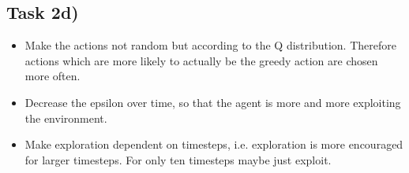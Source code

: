 \documentclass{article}
\begin{document}
\subsection*{Task 2d)}

\begin{itemize}
\item Make the actions not random but according to the Q distribution. Therefore actions which are more likely to actually be the greedy action are chosen more often.
\item Decrease the epsilon over time, so that the agent is more and more exploiting the environment.
\item Make exploration dependent on timesteps, i.e. exploration is more encouraged for larger timesteps. For only ten timesteps maybe just exploit.
\end{itemize}
\end{document}
